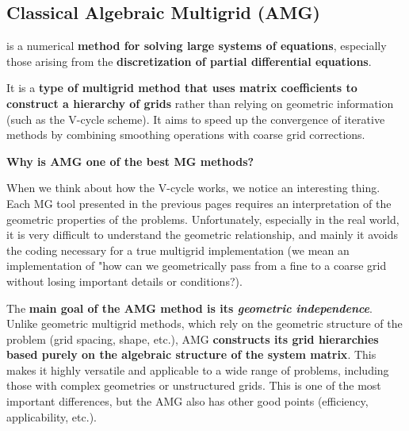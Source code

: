 \subsection{Classical Algebraic Multigrid (AMG)}

 is a numerical \textbf{method for solving large systems of equations}, especially those arising from the \textbf{discretization of partial differential equations}.

\highspace
It is a \textbf{type of multigrid method that uses matrix coefficients to construct a hierarchy of grids} rather than relying on geometric information (such as the V-cycle scheme). It aims to speed up the convergence of iterative methods by combining smoothing operations with coarse grid corrections.

\highspace
\begin{flushleft}
    \textcolor{Green3}{ \textbf{Why is AMG one of the best MG methods?}}
\end{flushleft}
When we think about how the V-cycle works, we notice an interesting thing. Each MG tool presented in the previous pages requires an interpretation of the geometric properties of the problems. Unfortunately, especially in the real world, it is very difficult to understand the geometric relationship, and mainly it avoids the coding necessary for a true multigrid implementation (we mean an implementation of "how can we geometrically pass from a fine to a coarse grid without losing important details or conditions?).

\highspace
The \textbf{main goal of the AMG method is its \emph{geometric independence}}. Unlike geometric multigrid methods, which rely on the geometric structure of the problem (grid spacing, shape, etc.), AMG \textbf{constructs its grid hierarchies based purely on the algebraic structure of the system matrix}. This makes it highly versatile and applicable to a wide range of problems, including those with complex geometries or unstructured grids. This is one of the most important differences, but the AMG also has other good points (efficiency, applicability, etc.).

